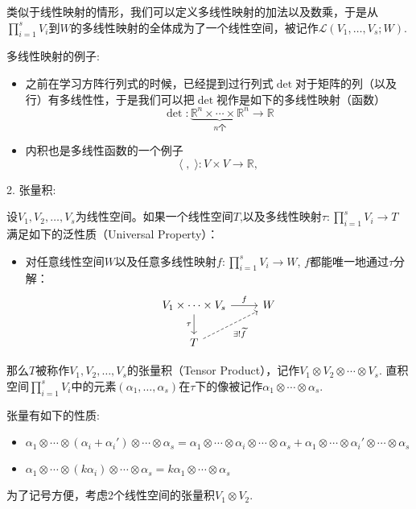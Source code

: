 类似于线性映射的情形，我们可以定义多线性映射的加法以及数乘，于是从$\prod\limits_{i=1}^s V_i$到$W$的多线性映射的全体成为了一个线性空间，被记作$\mathcal{L}(V_1,\ldots,V_s;W)$.

多线性映射的例子:

\begin{itemize}
\item 之前在学习方阵行列式的时候，已经提到过行列式$\det$对于矩阵的列（以及行）有多线性性，于是我们可以把$\det$视作是如下的多线性映射（函数）
$$\det: \underbrace{\mathbb{R}^n \times \cdots \times \mathbb{R}^n}_{\text{$n$个}} \rightarrow \mathbb{R}$$
\item 内积也是多线性函数的一个例子
$$\langle \;,\; \rangle: V\times V \rightarrow \mathbb{R},$$
\end{itemize}

\vspace{2em}

2. 张量积:

设$V_1,V_2,\ldots,V_s$为线性空间。如果一个线性空间$T$,以及多线性映射$\tau: \prod\limits_{i=1}^s V_i \to T$ 满足如下的泛性质（Universal Property）：
\begin{itemize}
\item 对任意线性空间$W$以及任意多线性映射$f: \prod\limits_{i=1}^s V_i \to W$, $f$都能唯一地通过$\tau$分解：
\[
\begin{tikzcd}
V_1 \times \cdots \times V_s \ar[r, "f"] \ar[d, "\tau"'] & W \\
T \ar[ur, dashrightarrow, "\exists! \widetilde{f}"'] &
\end{tikzcd}
\]
\end{itemize}
那么$T$被称作$V_1,V_2,\ldots,V_s$的张量积（Tensor Product），记作$V_1\otimes V_2\otimes \cdots \otimes V_s$. 直积空间$\prod\limits_{i=1}^s V_i$中的元素$(\alpha_1,\ldots,\alpha_s)$在$\tau$下的像被记作$\alpha_1\otimes\cdots\otimes\alpha_s.$

张量有如下的性质:
\begin{itemize}
\item $\alpha_1\otimes\cdots\otimes(\alpha_i+\alpha_i')\otimes\cdots\otimes\alpha_s = \alpha_1\otimes\cdots\otimes\alpha_i\otimes\cdots\otimes\alpha_s + \alpha_1\otimes\cdots\otimes\alpha_i'\otimes\cdots\otimes\alpha_s$
\item $\alpha_1\otimes\cdots\otimes(k\alpha_i)\otimes\cdots\otimes\alpha_s = k \alpha_1\otimes\cdots\otimes\alpha_s$
\end{itemize}

为了记号方便，考虑2个线性空间的张量积$V_1\otimes V_2$.

